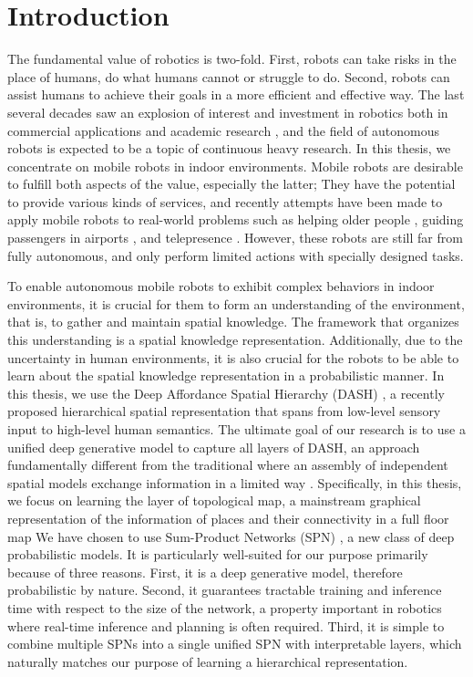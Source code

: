 \documentclass[10pt, titlepage]{article}
\theoremstyle{definition}
\begin{document}
\section{Introduction}
The fundamental value of robotics is two-fold. First, robots can take risks in the place of humans, do what humans cannot or struggle to do. Second, robots can assist humans to achieve their goals in a more efficient and effective way. The last several decades saw an explosion of interest and investment in robotics both in commercial applications and academic research \cite{pagliarini2017future}, and the field of autonomous robots is expected to be a topic of continuous heavy research.  In this thesis, we concentrate on mobile robots in indoor environments. Mobile robots are desirable to fulfill both aspects of the value, especially the latter; They have the potential to provide various kinds of services, and recently attempts have been made to apply mobile robots to real-world problems such as helping older people \cite{jayawardena2010deployment}, guiding passengers in airports \cite{triebel2016spencer}, and telepresence \cite{matsuda2016scalablebody}. However, these robots are still far from fully autonomous, and only perform limited actions with specially designed tasks.

To enable autonomous mobile robots to exhibit complex behaviors in indoor environments, it is crucial for them to form an understanding of the environment, that is, to gather and maintain spatial knowledge. The framework that organizes this understanding is a spatial knowledge representation. Additionally, due to the uncertainty in human environments, it is also crucial for the robots to be able to learn about the spatial knowledge representation in a probabilistic manner. In this thesis, we use the Deep Affordance Spatial Hierarchy (DASH) \cite{pronobis2017deep}, a recently proposed hierarchical spatial representation that spans from low-level sensory input to high-level human semantics.  The ultimate goal of our research is to use a unified deep generative model to capture all layers of DASH, an approach fundamentally different from the traditional where an assembly of independent spatial models exchange information in a limited way \cite{pronobis2016learning}. 
Specifically, in this thesis, we focus on learning the layer of topological map, a mainstream graphical representation of the information of places and their connectivity in a full floor map %
We have chosen to use Sum-Product Networks (SPN) \cite{poon2011sum}, a new class of deep probabilistic models. It is particularly well-suited for our purpose primarily because of three reasons. First, it is a deep generative model, therefore probabilistic by nature. Second, it guarantees tractable training and inference time with respect to the size of the network, a property important in robotics where real-time inference and planning is often required. Third, it is simple to combine multiple SPNs into a single unified SPN with interpretable layers, which naturally matches our purpose of learning a hierarchical representation.
\end{document}
